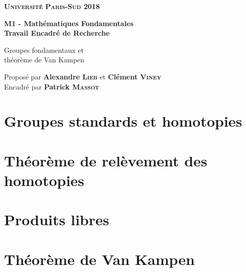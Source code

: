 \documentclass{article}[a4paper, twoside]
\begin{document}
	\onehalfspacing %
	
	\theoremstyle{plain}
	\newtheorem{theo}{Théorème}
	\newtheorem{prop}{Proposition}
	\newtheorem{coro}{Corollaire}
	\newtheorem*{lemm}{Lemme}
	
	\theoremstyle{definition}
	\newtheorem{defi}{Définition}
	
    \begin{titlepage}
		\thispagestyle{empty}
		\vspace*{2cm}
		{\Huge\bf \textsc{Université Paris-Sud} \hfill 2018}
		\vspace*{2cm}
		\begin{center}
			{\Huge\bf M1 - Mathématiques Fondamentales\\
			Travail Encadré de Recherche\par
			\vspace*{4cm}
			Groupes fondamentaux et\\ théorème de Van Kampen}
		\end{center}
		\vspace*{8cm}
		{\Large Proposé par \textbf{Alexandre \textsc{Lieb}} et \textbf{Clément \textsc{Viney}} 
		\\\hfill Encadré par \textbf{Patrick \textsc{Massot}}}
	\end{titlepage}
	
	\renewcommand{\contentsname}{Sommaire}
	\setcounter{tocdepth}{2}
	\tableofcontents
	\newpage{}
	
	\section{Groupes standards et homotopies}
	    
	
	\section{Théorème de relèvement des homotopies}
	    
	
	\section{Produits libres}
	    
	
	\section{Théorème de Van Kampen}
	    
	    
\end{document}
